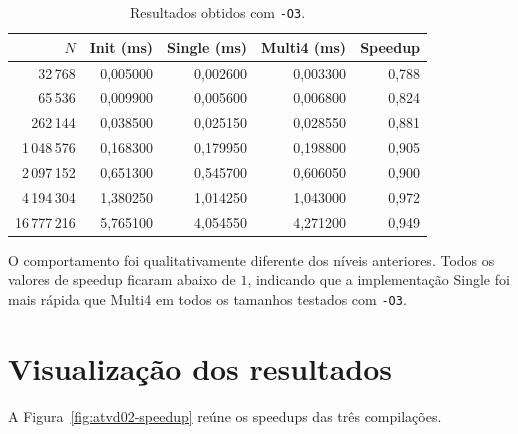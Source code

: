 \begin{table}[htbp]
\centering
\caption{Resultados obtidos com \texttt{-O3}.}
\label{tab:atvd02-o3}
\small
\begin{tabular}{r|r|r|r|r}
\hline
\(N\) & Init (ms) & Single (ms) & Multi4 (ms) & Speedup \\
\hline
32\,768      & 0,005000 & 0,002600 & 0,003300 & 0,788 \\
65\,536      & 0,009900 & 0,005600 & 0,006800 & 0,824 \\
262\,144     & 0,038500 & 0,025150 & 0,028550 & 0,881 \\
1\,048\,576  & 0,168300 & 0,179950 & 0,198800 & 0,905 \\
2\,097\,152  & 0,651300 & 0,545700 & 0,606050 & 0,900 \\
4\,194\,304  & 1,380250 & 1,014250 & 1,043000 & 0,972 \\
16\,777\,216 & 5,765100 & 4,054550 & 4,271200 & 0,949 \\
\hline
\end{tabular}
\end{table}

O comportamento foi qualitativamente diferente dos níveis anteriores. Todos os valores de
speedup ficaram abaixo de \(1\), indicando que a implementação Single foi mais rápida que
Multi4 em todos os tamanhos testados com \texttt{-O3}.


\section{Visualização dos resultados}

\label{sec:atvd02-visualizacao}

A Figura~\ref{fig:atvd02-speedup} reúne os speedups das três compilações.

